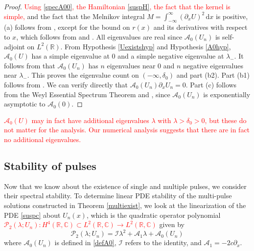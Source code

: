\documentclass[review,onefignum,onetabnum]{siamart171218}
\newcommand{\C}{\mathbb{C}}
\newcommand{\R}{\mathbb{R}}
\newcommand{\rmd}{\mathrm{d}}
\newcommand{\calA}{\mathcal{A}}
\newcommand{\calI}{\mathcal{I}}
\newcommand{\calP}{\mathcal{P}}
\newcommand{\revised}[1]{ \textcolor{red}{#1} }
\begin{document}
\begin{proof}
\revised{
Using \cref{specA00}, the Hamiltonian \cref{suspH}, the fact that the kernel is simple,
}
and the fact that the Melnikov integral $M = \int_{-\infty}^\infty (\partial_x U)^2\,\rmd x$ is positive, (a) follows from \cite[Theorem~3.6]{sandstede:iol97}, except for the bound on $r(x)$ and its derivatives with respect to $x$, which follows from \cite{Sanstede1993} and \cite{sandstede:som98}. All eigenvalues are real since $\calA_0(U_n)$ is self-adjoint on $L^2(\R)$.  From Hypothesis \ref{Uexistshyp} and Hypothesis \ref{A0hyp}, $\calA_0(U)$ has a simple eigenvalue at 0 and a simple negative eigenvalue at $\lambda_-$. It follows from \cite{alexander:ati90} that $\calA_0(U_n)$ has $n$ eigenvalues near 0 and $n$ negative eigenvalues near $\lambda_-$. This proves the eigenvalue count on $(-\infty, \delta_0)$ and part (b2). Part (b1) follows from \cite{sandstede:som98}. We can verify directly that $\calA_0(U_n)\partial_x U_n = 0$. Part (c) follows from the Weyl Essential Spectrum Theorem \cite[Theorem~2.2.6]{kapitula:sad13} and \cite[Theorem~3.1.11]{kapitula:sad13}, since $\calA_0(U_n)$ is exponentially asymptotic to $\calA_0(0)$.
\end{proof}

\revised{
\begin{remark}$\calA_0(U)$ may in fact have additional eigenvalues $\lambda$ with $\lambda > \delta_0 > 0$, but these do not matter for the analysis. Our numerical analysis suggests that there are in fact no additional eigenvalues.
\end{remark}
}

\subsection{Stability of pulses}

Now that we know about the existence of single and multiple pulses, we consider their spectral stability. To determine linear PDE stability of the multi-pulse solutions constructed in Theorem \ref{multiexist}, we look at the linearization of the PDE \cref{suspc} about $U_n(x)$, which is the quadratic operator polynomial 
\revised{
$\calP_2(\lambda; U_n): H^4(\R, \C) \subset L^2(\R,\C) \rightarrow L^2(\R,\C)$
}
given by
\begin{equation}\label{quadeig}
\calP_2(\lambda; U_n) = \calI \lambda^2 + \calA_1 \lambda + \calA_0(U_n)
\end{equation}
where $\calA_0(U_n)$ is defined in \cref{defA0}, $\calI$ refers to the identity, and $\calA_1=-2 c \partial_x$.
\end{document}
